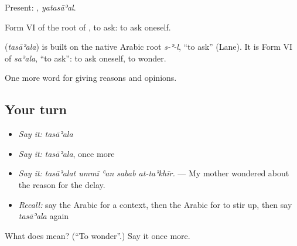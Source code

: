 Present: , \emph{yatasāʾal}.

Form VI of the root of , to ask: to ask oneself.

\begin{cousinweb}
\textbf{} (\emph{tasāʾala}) is built on the native Arabic root \emph{s-ʾ-l}, \textquotedblleft{}to ask\textquotedblright{} (Lane). It is Form VI of \emph{saʾala}, \textquotedblleft{}to ask\textquotedblright{}: to ask oneself, to wonder.
\end{cousinweb}

\begin{grammarlens}[title={What you've built}]
One more word for giving reasons and opinions.
\end{grammarlens}

\subsection*{Your turn}
\begin{itemize}
\raggedright
  \item \emph{Say it:} \emph{tasāʾala}
  \item \emph{Say it:} \emph{tasāʾala}, once more
  \item \emph{Say it:} \emph{tasāʾalat ummī ʿan sabab at-taʾkhīr.} — My mother wondered about the reason for the delay.
  \item \emph{Recall:} say the Arabic for a context, then the Arabic for to stir up, then say \emph{tasāʾala} again
\end{itemize}

\begin{tcolorbox}[breakable,colback=teal!4,colframe=teal!35!black,title={Before you move on}]
What does  mean? (\textquotedblleft{}To wonder\textquotedblright{}.) Say it once more.
\end{tcolorbox}
